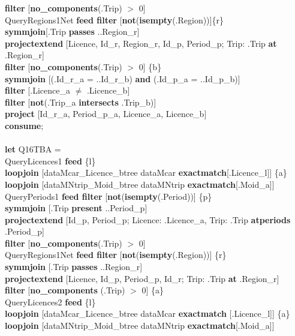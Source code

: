 \documentclass[a4paper]{article}
\newcommand{\op}[1]{\textbf{#1}}
\begin{document}
\begin{scriptsize}
\begin{tabbing}
\>\>\>\op{filter} [\op{no\_components}(.Trip) $>$ 0]\\
\>\>QueryRegions1Net \op{feed filter} [\op{not}(\op{isempty}(.Region))]\{r\}\\
\>\>\op{symmjoin}[.Trip \op{passes} ..Region\_r]\\
\>\>\op{projectextend} [Licence, Id\_r, Region\_r, Id\_p, Period\_p; Trip: .Trip \op{at} .Region\_r]\\
\>\>\op{filter} [\op{no\_components}(.Trip) $>$ 0] \{b\}\\
\>\op{symmjoin} [(.Id\_r\_a = ..Id\_r\_b) \op{and} (.Id\_p\_a = ..Id\_p\_b)]\\
\>\op{filter} [.Licence\_a $\neq$ .Licence\_b]\\
\>\op{filter} [\op{not}(.Trip\_a \op{intersects} .Trip\_b)]\\
\>\op{project} [Id\_r\_a, Period\_p\_a, Licence\_a, Licence\_b]\\
\op{consume};\\
\\
\op{let} Q16TBA =\\
\>QueryLicences1 \op{feed} \{l\}\\
\>\>\>\op{loopjoin} [dataMcar\_Licence\_btree dataMcar \op{exactmatch}[.Licence\_l]] \{a\}\\
\>\>\>\op{loopjoin} [dataMNtrip\_Moid\_btree dataMNtrip \op{exactmatch}[.Moid\_a]]\\
\>\>QueryPeriods1 \op{feed filter} [\op{not}(\op{isempty}(.Period))] \{p\}\\
\>\>\op{symmjoin} [.Trip \op{present} ..Period\_p]\\
\>\>\>\op{projectextend} [Id\_p, Period\_p; Licence: .Licence\_a, Trip: .Trip \op{atperiods} .Period\_p]\\
\>\>\>\op{filter} [\op{no\_components}(.Trip) $>$ 0]\\
\>\>QueryRegions1Net \op{feed filter} [\op{not}(\op{isempty}(.Region))] \{r\}\\
\>\>\op{symmjoin} [.Trip \op{passes} ..Region\_r]\\
\>\>\>\op{projectextend} [Licence, Id\_p, Period\_p, Id\_r; Trip: .Trip \op{at} .Region\_r]\\
\>\>\>\op{filter} [\op{no\_components} (.Trip) $>$ 0] \{a\}\\
\>QueryLicences2 \op{feed} \{l\}\\
\>\>\>\op{loopjoin} [dataMcar\_Licence\_btree dataMcar \op{exactmatch} [.Licence\_l]] \{a\}\\
\>\>\>\op{loopjoin} [dataMNtrip\_Moid\_btree dataMNtrip \op{exactmatch}[.Moid\_a]]\\

\end{tabbing}
\end{scriptsize}
\end{document}
